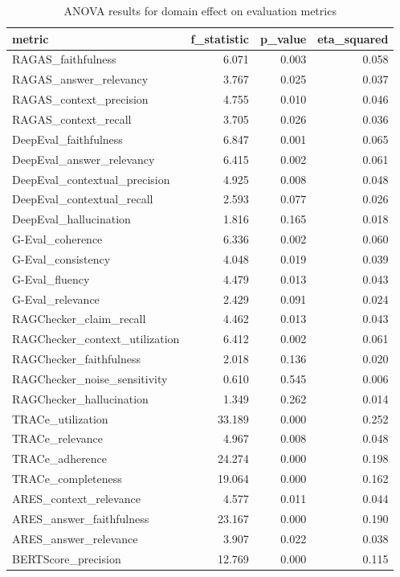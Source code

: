 \begin{table}
\caption{ANOVA results for domain effect on evaluation metrics}
\label{tab:anova}
\begin{tabular}{lrrr}
\toprule
metric & f_statistic & p_value & eta_squared \\
\midrule
RAGAS_faithfulness & 6.071 & 0.003 & 0.058 \\
RAGAS_answer_relevancy & 3.767 & 0.025 & 0.037 \\
RAGAS_context_precision & 4.755 & 0.010 & 0.046 \\
RAGAS_context_recall & 3.705 & 0.026 & 0.036 \\
DeepEval_faithfulness & 6.847 & 0.001 & 0.065 \\
DeepEval_answer_relevancy & 6.415 & 0.002 & 0.061 \\
DeepEval_contextual_precision & 4.925 & 0.008 & 0.048 \\
DeepEval_contextual_recall & 2.593 & 0.077 & 0.026 \\
DeepEval_hallucination & 1.816 & 0.165 & 0.018 \\
G-Eval_coherence & 6.336 & 0.002 & 0.060 \\
G-Eval_consistency & 4.048 & 0.019 & 0.039 \\
G-Eval_fluency & 4.479 & 0.013 & 0.043 \\
G-Eval_relevance & 2.429 & 0.091 & 0.024 \\
RAGChecker_claim_recall & 4.462 & 0.013 & 0.043 \\
RAGChecker_context_utilization & 6.412 & 0.002 & 0.061 \\
RAGChecker_faithfulness & 2.018 & 0.136 & 0.020 \\
RAGChecker_noise_sensitivity & 0.610 & 0.545 & 0.006 \\
RAGChecker_hallucination & 1.349 & 0.262 & 0.014 \\
TRACe_utilization & 33.189 & 0.000 & 0.252 \\
TRACe_relevance & 4.967 & 0.008 & 0.048 \\
TRACe_adherence & 24.274 & 0.000 & 0.198 \\
TRACe_completeness & 19.064 & 0.000 & 0.162 \\
ARES_context_relevance & 4.577 & 0.011 & 0.044 \\
ARES_answer_faithfulness & 23.167 & 0.000 & 0.190 \\
ARES_answer_relevance & 3.907 & 0.022 & 0.038 \\
BERTScore_precision & 12.769 & 0.000 & 0.115 \\

\end{tabular}
\end{table}
